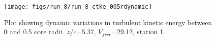 \begin{figure}[H]
\centering
\texttt{[image: figs/run\_8/run\_8\_ctke\_005rdynamic]}
\caption{Plot showing dynamic variations in turbulent kinetic energy between 0 and 0.5 core radii. $z/c$=5.37, $V_{free}$=29.12, station 1.}
\label{fig:run_8_ctke_005rdynamic}
\end{figure}


